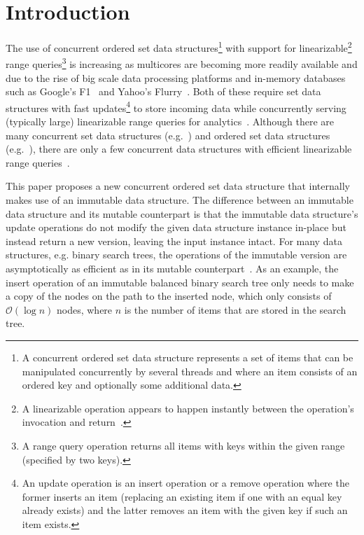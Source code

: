 \documentclass[a4paper,UKenglish]{oasics-v2016}
\begin{document}
\section{Introduction\label{sec:intro}}
The use of concurrent ordered set data structures\footnote{A concurrent ordered set data structure represents a set of items that can be manipulated concurrently by several threads and where an item consists of an ordered key and optionally some additional data.} with support for linearizable\footnote{A linearizable operation appears to happen instantly between the operation's invocation and return~\cite{HerlihyLinearizability}.} range queries\footnote{A range query operation returns all items with keys within the given range (specified by two keys).} is increasing as multicores are becoming more readily available and due to the rise of big scale data processing platforms and in-memory databases such as Google's F1~\cite{ShuteF1} and Yahoo's Flurry~\cite{Furry}.
Both of these require set data structures with fast updates\footnote{An update operation is an insert operation or a remove operation where the former inserts an item (replacing an existing item if one with an equal key already exists) and the latter removes an item with the given key if such an item exists.} to store incoming data while concurrently serving (typically large) linearizable range queries for analytics~\cite{BasinKiWi}. %
Although there are many concurrent set data structures (e.g.~\cite{shalevExtendableLockFreeHash, michaelHashTable, ProkopecCtrie}) and ordered set data structures (e.g.~\cite{fraser2004practical,NatarajanFastLockFree,NBKASearchTree}), there are only a few concurrent data structures with efficient linearizable range queries~\cite{RangeQKArySeachTree,AvniLeaplist,CFRangeQueries,CATreeLCPC,ChatterjeeLFRangeQueries,BasinKiWi}.

This paper proposes a new concurrent ordered set data structure that internally makes use of an immutable data structure. %
The difference between an immutable data structure and its mutable counterpart is that the immutable data structure's update operations do not modify the given data structure instance in-place but instead return a new version, leaving the input instance intact. %
For many data structures, e.g. binary search trees, the operations of the immutable version are asymptotically as efficient as in its mutable counterpart~\cite{okasaki1999purely}.
As an example, the insert operation of an immutable balanced binary search tree only needs to make a copy of the nodes on the path to the inserted node, which only consists of $\mathcal{O}(\log{}n)$ nodes, where $n$ is the number of items that are stored in the search tree. 
\end{document}
